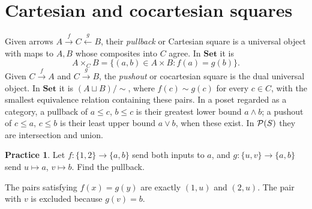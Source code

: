 \documentclass[11pt,openany]{book}
\theoremstyle{definition}
\newtheorem{exercise}[theorem]{Practice}
\begin{document}
\section{Cartesian and cocartesian squares}
Given arrows $A\xrightarrow{f}C\xleftarrow{g}B$, their \emph{pullback} or Cartesian square is a universal object with maps to $A,B$ whose composites into $C$ agree. In $\mathbf{Set}$ it is
\[A\times_C B=\{(a,b)\in A\times B:f(a)=g(b)\}.\]
Given $C\xrightarrow{f}A$ and $C\xrightarrow{g}B$, the \emph{pushout} or cocartesian square is the dual universal object. In $\mathbf{Set}$ it is $(A\sqcup B)/\sim$, where $f(c)\sim g(c)$ for every $c\in C$, with the smallest equivalence relation containing these pairs.
In a poset regarded as a category, a pullback of $a\le c$, $b\le c$ is their greatest lower bound $a\wedge b$; a pushout of $c\le a$, $c\le b$ is their least upper bound $a\vee b$, when these exist. In $\mathcal P(S)$ they are intersection and union.
\begin{exercise}Let $f:\{1,2\}\to\{a,b\}$ send both inputs to $a$, and $g:\{u,v\}\to\{a,b\}$ send $u\mapsto a$, $v\mapsto b$. Find the pullback.\end{exercise}
\begin{solution}The pairs satisfying $f(x)=g(y)$ are exactly $(1,u)$ and $(2,u)$. The pair with $v$ is excluded because $g(v)=b$.\end{solution}
\end{document}
